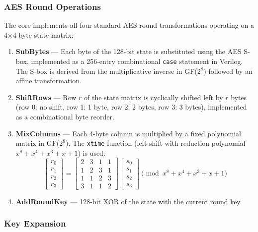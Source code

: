 \documentclass[12pt,a4paper]{article}
\begin{document}
\subsubsection{AES Round Operations}

The core implements all four standard AES round transformations operating on a 4$\times$4 byte state matrix:

\begin{enumerate}[leftmargin=*]
    \item \textbf{SubBytes} --- Each byte of the 128-bit state is substituted using the AES S-box, implemented as a 256-entry combinational \texttt{case} statement in Verilog. The S-box is derived from the multiplicative inverse in GF($2^8$) followed by an affine transformation.
    \item \textbf{ShiftRows} --- Row $r$ of the state matrix is cyclically shifted left by $r$ bytes (row 0: no shift, row 1: 1 byte, row 2: 2 bytes, row 3: 3 bytes), implemented as a combinational byte reorder.
    \item \textbf{MixColumns} --- Each 4-byte column is multiplied by a fixed polynomial matrix in GF($2^8$). The \texttt{xtime} function (left-shift with reduction polynomial $x^8+x^4+x^3+x+1$) is used:
    \begin{equation}
    \begin{bmatrix} r_0 \\ r_1 \\ r_2 \\ r_3 \end{bmatrix}
    =
    \begin{bmatrix} 2 & 3 & 1 & 1 \\ 1 & 2 & 3 & 1 \\ 1 & 1 & 2 & 3 \\ 3 & 1 & 1 & 2 \end{bmatrix}
    \begin{bmatrix} s_0 \\ s_1 \\ s_2 \\ s_3 \end{bmatrix}
    \pmod{x^8+x^4+x^3+x+1}
    \end{equation}
    \item \textbf{AddRoundKey} --- 128-bit XOR of the state with the current round key.
\end{enumerate}

\subsubsection{Key Expansion}
\end{document}
